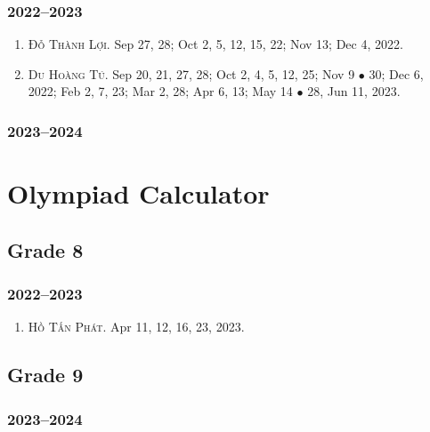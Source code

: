 \documentclass{article}
\begin{document}
\subsubsection{2022--2023}

\begin{enumerate}
	\item \textsc{Đỗ Thành Lợi.} {\sf[In]} Sep 27, 28; Oct 2, 5, 12, 15, 22; Nov 13; Dec 4, 2022. {\sf[Out]}
	\item \textsc{Du Hoàng Tú.} {\sf[In]} Sep 20, 21, 27, 28; Oct 2, 4, 5, 12, 25; Nov 9 $\bullet$ 30; Dec 6, 2022; Feb 2, 7, 23; Mar 2, 28; Apr 6, 13; May 14 $\bullet$ 28, Jun 11, 2023. {\sf[Out]}
\end{enumerate}

\subsubsection{2023--2024}


\section{Olympiad Calculator}

\subsection{Grade 8}

\subsubsection{2022--2023}

\begin{enumerate}
	\item \textsc{Hồ Tấn Phát.} {\sf[In]} Apr 11, 12, 16, 23, 2023.
\end{enumerate}


\subsection{Grade 9}

\subsubsection{2023--2024}
\end{document}
